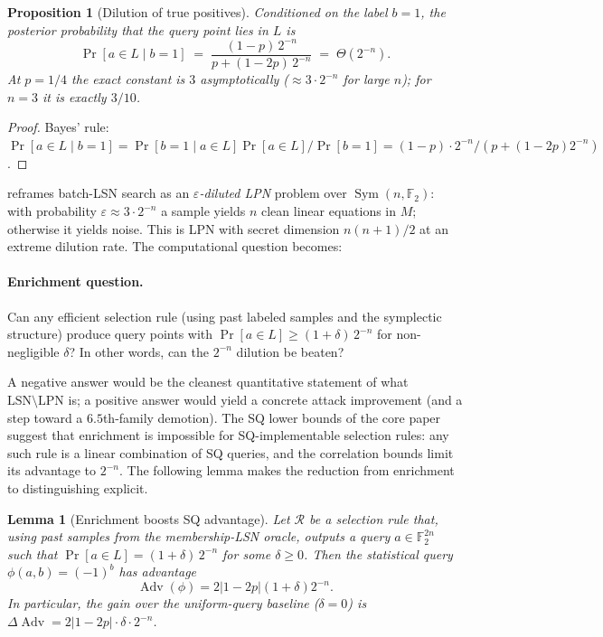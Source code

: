 \documentclass[11pt,a4paper]{article}
\theoremstyle{plain}
\newtheorem{lemma}[theorem]{Lemma}
\newtheorem{proposition}[theorem]{Proposition}
\theoremstyle{definition}
\newcommand{\F}{\mathbb{F}}
\begin{document}
\begin{proposition}[Dilution of true positives]
\label{prop:dilution}
Conditioned on the label $b=1$, the posterior probability that the query point lies in $L$ is
\[
\Pr[a \in L \mid b=1] \;=\; \frac{(1-p)\,2^{-n}}{p + (1-2p)\,2^{-n}} \;=\; \Theta(2^{-n}).
\]
At $p=1/4$ the exact constant is $3$ asymptotically ($\approx 3\cdot 2^{-n}$ for large $n$); for $n=3$ it is exactly $3/10$.
\end{proposition}

\begin{proof}
Bayes' rule: $\Pr[a \in L \mid b=1] = \Pr[b=1 \mid a \in L]\Pr[a \in L] / \Pr[b=1] = (1-p)\cdot 2^{-n} / (p + (1-2p)2^{-n})$.
\end{proof}

 reframes batch-LSN search as an \emph{$\varepsilon$-diluted LPN} problem over $\operatorname{Sym}(n,\F_2)$: with probability $\varepsilon \approx 3\cdot 2^{-n}$ a sample yields $n$ clean linear equations in $M$; otherwise it yields noise.  This is LPN with secret dimension $n(n+1)/2$ at an extreme dilution rate.  The computational question becomes:

\paragraph{Enrichment question.}
\label{q:enrichment}
Can any efficient selection rule (using past labeled samples and the symplectic structure) produce query points with $\Pr[a \in L] \geq (1+\delta)\,2^{-n}$ for non-negligible $\delta$?  In other words, can the $2^{-n}$ dilution be beaten?

A negative answer would be the cleanest quantitative statement of what $\mathrm{LSN}\setminus\mathrm{LPN}$ is; a positive answer would yield a concrete attack improvement (and a step toward a $6.5$th-family demotion).  The SQ lower bounds of the core paper suggest that enrichment is impossible for SQ-implementable selection rules: any such rule is a linear combination of SQ queries, and the correlation bounds limit its advantage to $2^{-n}$. The following lemma makes the reduction from enrichment to distinguishing explicit.

\begin{lemma}[Enrichment boosts SQ advantage]
\label{lem:enrichment-sq}
Let $\mathcal{R}$ be a selection rule that, using past samples from the membership-LSN oracle, outputs a query $a \in \F_2^{2n}$ such that $\Pr[a \in L] = (1+\delta)\,2^{-n}$ for some $\delta \ge 0$. Then the statistical query $\phi(a,b) = (-1)^b$ has advantage
\[
  \operatorname{Adv}(\phi) = 2|1-2p|(1+\delta)2^{-n}.
\]
In particular, the gain over the uniform-query baseline ($\delta=0$) is $\Delta\operatorname{Adv} = 2|1-2p|\cdot\delta\cdot 2^{-n}$.
\end{lemma}
\end{document}
